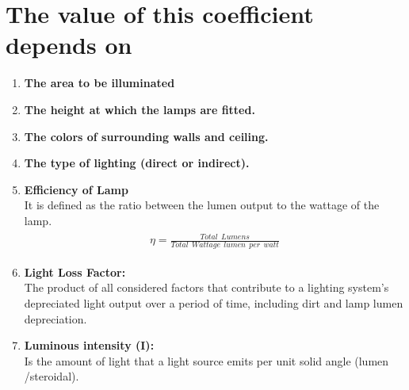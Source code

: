 \documentclass[12pt,fleqn]{book} %
\begin{document}
 \section{The value of this coefficient depends on }
\begin{enumerate}
\item \textbf {The area to be illuminated}
\item \textbf {The height at which the lamps are fitted.}
\item \textbf {The colors of surrounding walls and ceiling.}
\item \textbf {The type of lighting (direct or indirect).}
\item \textbf {Efficiency of Lamp } 
\\It is defined as the ratio between the lumen output to the wattage of the lamp.
\begin{align} 
\begin{split}
\eta =\frac{Total\ \ Lumens}{Total\ \ Wattage \ \ lumen\ \ per\ \ watt}
\end{split}					
\end{align} 
\item \textbf {Light Loss Factor:}
\\The product of all considered factors that contribute to a lighting system's depreciated light output over a period of time, including dirt and lamp lumen depreciation. 
\item \textbf {Luminous intensity (I):}
\\Is the amount of light that a light source emits per unit solid angle (lumen /steroidal). 
\end{enumerate}
\end{document}
